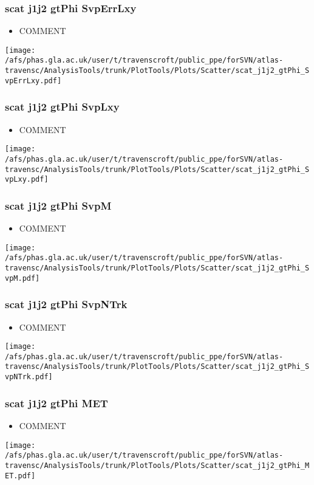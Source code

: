 \documentclass{beamer}
\begin{document}
\begin{frame}
\frametitle{scat j1j2 gtPhi SvpErrLxy}
\begin{itemize}
\item COMMENT
\end{itemize}
\begin{center}
\texttt{[image: /afs/phas.gla.ac.uk/user/t/travenscroft/public\_ppe/forSVN/atlas-travensc/AnalysisTools/trunk/PlotTools/Plots/Scatter/scat\_j1j2\_gtPhi\_SvpErrLxy.pdf]}
\end{center}
\end{frame}

\begin{frame}
\frametitle{scat j1j2 gtPhi SvpLxy}
\begin{itemize}
\item COMMENT
\end{itemize}
\begin{center}
\texttt{[image: /afs/phas.gla.ac.uk/user/t/travenscroft/public\_ppe/forSVN/atlas-travensc/AnalysisTools/trunk/PlotTools/Plots/Scatter/scat\_j1j2\_gtPhi\_SvpLxy.pdf]}
\end{center}
\end{frame}

\begin{frame}
\frametitle{scat j1j2 gtPhi SvpM}
\begin{itemize}
\item COMMENT
\end{itemize}
\begin{center}
\texttt{[image: /afs/phas.gla.ac.uk/user/t/travenscroft/public\_ppe/forSVN/atlas-travensc/AnalysisTools/trunk/PlotTools/Plots/Scatter/scat\_j1j2\_gtPhi\_SvpM.pdf]}
\end{center}
\end{frame}

\begin{frame}
\frametitle{scat j1j2 gtPhi SvpNTrk}
\begin{itemize}
\item COMMENT
\end{itemize}
\begin{center}
\texttt{[image: /afs/phas.gla.ac.uk/user/t/travenscroft/public\_ppe/forSVN/atlas-travensc/AnalysisTools/trunk/PlotTools/Plots/Scatter/scat\_j1j2\_gtPhi\_SvpNTrk.pdf]}
\end{center}
\end{frame}

\begin{frame}
\frametitle{scat j1j2 gtPhi MET}
\begin{itemize}
\item COMMENT
\end{itemize}
\begin{center}
\texttt{[image: /afs/phas.gla.ac.uk/user/t/travenscroft/public\_ppe/forSVN/atlas-travensc/AnalysisTools/trunk/PlotTools/Plots/Scatter/scat\_j1j2\_gtPhi\_MET.pdf]}
\end{center}
\end{frame}
\end{document}
